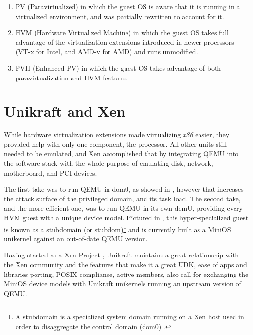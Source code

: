 \begin{enumerate}
  \item PV (Paravirtualized) in which the guest OS is aware that it is running in a virtualized environment, and was partially rewritten to account for it.
  \item HVM (Hardware Virtualized Machine) in which the guest OS takes full advantage of the virtualization extensions introduced in newer processors (VT-x for Intel, and AMD-v for AMD) and runs unmodified.
  \item PVH (Enhanced PV) in which the guest OS takes advantage of both paravirtualization and HVM features.
\end{enumerate}

\section{Unikraft and Xen}
\label{sec:unikraft-xen}

While hardware virtualization extensions made virtualizing \textit{x86} easier, they provided help with only one component, the processor.
All other units still needed to be emulated, and Xen accomplished that by integrating QEMU into the software stack with the whole purpose of emulating disk, network, motherboard, and PCI devices.

The first take was to run QEMU in dom0, as showed in  , however that increases the attack surface of the privileged domain, and its task load.
The second take, and the more efficient one, was to run QEMU in its own domU, providing every HVM guest with a unique device model.
Pictured in , this hyper-specialized guest is known as a stubdomain (or stubdom)\footnote{A stubdomain is a specialized system domain running on a Xen host used in order to disaggregate the control domain (dom0) \cite{xen-stubdomain}.} and is currently built as a MiniOS \cite{minios} unikernel against an out-of-date QEMU version.


Having started as a Xen Project \cite{unikraft-xen}, Unikraft maintains a great relationship with the Xen community and the features that make it a great UDK, ease of apps and libraries porting, POSIX compliance, active members, also call for exchanging the MiniOS device models with Unikraft unikernels running an upstream version of QEMU.

